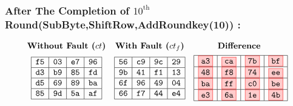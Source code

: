 \subsubsection{After The Completion of $10^{\text{th}}$ Round(SubByte,ShiftRow,AddRoundkey(10)) :}
\[
\begin{array}{ccc}
\textbf{Without Fault ($ct$)} & \textbf{With Fault ($ct_f$)} & \textbf{Difference } \\[1ex]
\begin{array}{|c|c|c|c|}
    \hline
    \texttt{f5} & \texttt{03} & \texttt{e7} & \texttt{96} \\
    \hline
    \texttt{d3} & \texttt{b9} & \texttt{85} & \texttt{fd} \\
    \hline
    \texttt{d5} & \texttt{69} & \texttt{89} & \texttt{ba} \\
    \hline
    \texttt{85} & \texttt{9d} & \texttt{5a} & \texttt{af} \\
    \hline
\end{array} 
&

\begin{array}{|c|c|c|c|}
    \hline
    \texttt{56} & \texttt{c9} & \texttt{9c} & \texttt{29} \\
    \hline
    \texttt{9b} & \texttt{41} & \texttt{f1} & \texttt{13} \\
    \hline
    \texttt{6f} & \texttt{96} & \texttt{49} & \texttt{04} \\
    \hline
    \texttt{66} & \texttt{f7} & \texttt{44} & \texttt{e4} \\
    \hline
\end{array}

    &

    \begin{array}{|c|c|c|c|}
        \hline
        \fcolorbox{red}{red!20}{\texttt{a3}} & \fcolorbox{red}{red!20}{\texttt{ca}} & \fcolorbox{red}{red!20}{\texttt{7b}} & \fcolorbox{red}{red!20}{\texttt{bf}} \\
        \hline
        \fcolorbox{red}{red!20}{\texttt{48}} & \fcolorbox{red}{red!20}{\texttt{f8}} & \fcolorbox{red}{red!20}{\texttt{74}} & \fcolorbox{red}{red!20}{\texttt{ee}} \\
        \hline
        \fcolorbox{red}{red!20}{\texttt{ba}} & \fcolorbox{red}{red!20}{\texttt{ff}} & \fcolorbox{red}{red!20}{\texttt{c0}} & \fcolorbox{red}{red!20}{\texttt{be}} \\
        \hline
        \fcolorbox{red}{red!20}{\texttt{e3}} & \fcolorbox{red}{red!20}{\texttt{6a}} & \fcolorbox{red}{red!20}{\texttt{1e}} & \fcolorbox{red}{red!20}{\texttt{4b}} \\
        \hline
    \end{array}
    
\end{array}
\]
